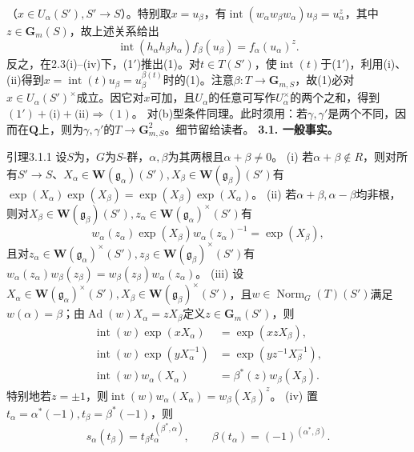 （$x\in U_\alpha(S'),S'\to S$）。特别取$x=u_\beta$，有$\operatorname{int}(w_\alpha w_\beta w_\alpha)u_\beta=u_\alpha^z$，其中$z\in\mathbf G_m(S)$，故上述关系给出
\[\operatorname{int}(h_\alpha h_\beta h_\alpha)f_\beta(u_\beta)=f_\alpha(u_\alpha)^z.\tag{1'}\]
反之，在2.3(i)--(iv)下，(1$'$)推出(1)。对$t\in T(S')$，使$\operatorname{int}(t)$于(1$'$)，利用(i)、(ii)得到$x=\operatorname{int}(t)u_\beta=u_\beta^{\beta(t)}$时的(1)。注意$\beta:T\to\mathbf G_{m,S}$，故(1)必对$x\in U_\alpha(S')^\times$成立。因它对$x$可加，且$U_\alpha$的任意可写作$U_\alpha^\times$的两个之和，得到$(1')+\text{(i)}+\text{(ii)}\Rightarrow(1)$。
对(b)型条件同理。此时须用：若$\gamma,\gamma'$是两个不同，因而在$\mathbf Q$上，则为$\gamma,\gamma'$的$T\to\mathbf G_{m,S}^2$。细节留给读者。
\textbf{3.1. 一般事实。}
\begin{SGAresult}{引理}{3.1.1}
设$S$为，$G$为$S$-群，$\alpha,\beta$为其两根且$\alpha+\beta\ne0$。
(i) 若$\alpha+\beta\notin R$，则对所有$S'\to S$、$X_\alpha\in\mathbf W(\mathfrak g_\alpha)(S'),X_\beta\in\mathbf W(\mathfrak g_\beta)(S')$有$\exp(X_\alpha)\exp(X_\beta)=\exp(X_\beta)\exp(X_\alpha)$。
(ii) 若$\alpha+\beta,\alpha-\beta$均非根，则对$X_\beta\in\mathbf W(\mathfrak g_\beta)(S'),z_\alpha\in\mathbf W(\mathfrak g_\alpha)^\times(S')$有
\[w_\alpha(z_\alpha)\exp(X_\beta)w_\alpha(z_\alpha)^{-1}=\exp(X_\beta),\]
且对$z_\alpha\in\mathbf W(\mathfrak g_\alpha)^\times(S'),z_\beta\in\mathbf W(\mathfrak g_\beta)^\times(S')$有$w_\alpha(z_\alpha)w_\beta(z_\beta)=w_\beta(z_\beta)w_\alpha(z_\alpha)$。
(iii) 设$X_\alpha\in\mathbf W(\mathfrak g_\alpha)^\times(S'),X_\beta\in\mathbf W(\mathfrak g_\beta)^\times(S')$，且$w\in\operatorname{Norm}_G(T)(S')$满足$w(\alpha)=\beta$；由$\operatorname{Ad}(w)X_\alpha=zX_\beta$定义$z\in\mathbf G_m(S')$，则
\[\begin{aligned}\operatorname{int}(w)\exp(xX_\alpha)&=\exp(xzX_\beta),\\\operatorname{int}(w)\exp(yX_\alpha^{-1})&=\exp(yz^{-1}X_\beta^{-1}),\\\operatorname{int}(w)w_\alpha(X_\alpha)&=\beta^*(z)w_\beta(X_\beta).\end{aligned}\]
特别地若$z=\pm1$，则$\operatorname{int}(w)w_\alpha(X_\alpha)=w_\beta(X_\beta)^z$。
(iv) 置$t_\alpha=\alpha^*(-1),t_\beta=\beta^*(-1)$，则
\[s_\alpha(t_\beta)=t_\beta t_\alpha^{(\beta^*,\alpha)},\qquad\beta(t_\alpha)=(-1)^{(\alpha^*,\beta)}.\]
\end{SGAresult}
